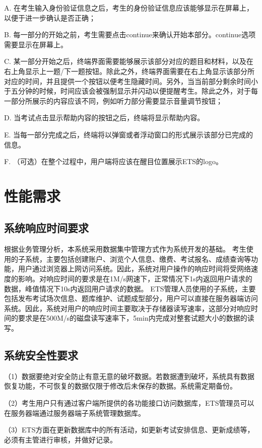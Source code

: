 A. 在考生输入身份验证信息之后，考生的身份验证信息应该能够显示在屏幕上，以便于进一步确认是否正确；

B. 每一部分的开始之前，考生需要点击continue来确认开始本部分。continue选项需要显示在屏幕上。

C. 某一部分开始之后，终端界面需要能够展示该部分对应的题目和材料，以及在右上角显示上一题/下一题按钮。除此之外，终端界面需要在右上角显示该部分所对应的时间，并且提供一个按钮以便考生隐藏时间。另外，当当前部分剩余时间小于五分钟的时候，时间应该会被强制显示并闪动以便提醒考生。除此之外，对于每一部分所展示的内容应该不同，例如听力部分需要显示音量调节按钮；

D. 当考试点击显示帮助内容的按钮之后，终端将显示帮助内容。

E. 当每一部分完成之后，终端将以弹窗或者浮动窗口的形式展示该部分已完成的信息。

F. （可选）在整个过程中，用户端将应该在醒目位置展示ETS的logo。



\section{性能需求}

\subsection{系统响应时间要求}
根据业务管理分析，本系统采用数据集中管理方式作为系统开发的基础。
考生使用的子系统，主要包括创建账户、浏览个人信息、缴费、考试报名、成绩查询等功能，用户通过浏览器上网访问系统。因此，系统对用户操作的响应时间将受网络速度的影响。对响应时间的要求是在1M/s网速下，正常情况下1s内返回用户请求的数据，峰值情况下10s内返回用户请求的数据。
ETS管理人员使用的子系统，主要包括发布考试场次信息、题库维护、试题成型部分，用户可以直接在服务器端访问系统。因此，系统对用户的响应时间主要取决于存储器读写速率，这部分对响应时间的要求是在500M/s的磁盘读写速率下，5min内完成对整套试题大小的数据的读写。

\subsection{系统安全性要求}
（1）数据要绝对安全防止有意无意的破坏数据。若数据遭到破坏，系统具有数据恢复功能，不可恢复的数据仅限于修改后未保存的数据。系统需定期备份。

（2）考生用户只有通过客户端所提供的各功能接口访问数据库，ETS管理员可以在服务器端通过服务器端子系统管理数据库。

（3）ETS方面在更新数据库中的所有活动，如更新考试安排信息、更新成绩等，必须有主管进行审核，并做好记录。

